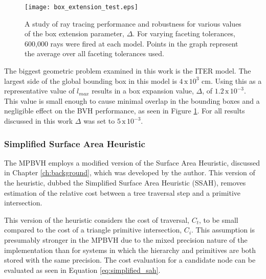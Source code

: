 \begin{figure}[H]
  \centering
  \texttt{[image: box\_extension\_test.eps]}
  \caption[Results of ray fire performance for various box extension values.]{A
    study of ray tracing performance and robustness for various values of the
    box extension parameter, $\Delta$. For varying faceting tolerances, 600,000
    rays were fired at each model. Points in the graph represent the average
    over all faceting tolerances used.}
  \label{fig:box_bump_tests}
\end{figure}

The biggest geometric problem examined in this work is the ITER model. The
largest side of the global bounding box in this model is $4 \, \text{x} \,
10^{3}$ cm. Using this as a representative value of $l_{max}$ results in a box
expansion value, $\Delta$, of $1.2 \, \text{x} \, 10^{-3}$. This value is small
enough to cause minimal overlap in the bounding boxes and a negligible effect on
the BVH performance, as seen in Figure \ref{fig:box_bump_tests}. For all results
discussed in this work $\Delta$ was set to $5 \, \text{x} \, 10 ^{-3}$.

\subsubsection{Simplified Surface Area Heuristic}\label{sec:ssah}

The MPBVH employs a modified version of the Surface Area Heuristic,
discussed in Chapter \ref{ch:background}, which was developed by the
author. This version of the heuristic, dubbed the Simplified Surface Area
Heuristic (SSAH), removes estimation of the relative cost between a tree
traversal step and a primitive intersection.

This version of the heuristic considers the cost of traversal, $C_{t}$, to be
small compared to the cost of a triangle primitive intersection, $C_{i}$. This
assumption is presumably stronger in the MPBVH due to the mixed precision nature
of the implementation than for systems in which the hierarchy and primitives are
both stored with the same precision. The cost evaluation for a candidate node
can be evaluated as seen in Equation \eqref{eq:simplified_sah}.

